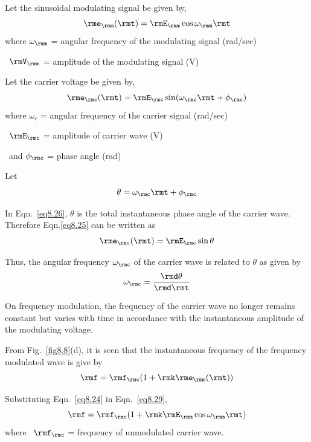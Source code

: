 
Let the sinusoidal modulating signal be given by,
\begin{equation}
\rme_\rmm(\rmt) = \rmE_\rmm \cos \omega_\rmm \rmt\label{eq8.24}
\end{equation}
where $\omega_\rmm$ = angular frequency of the modulating signal (rad/sec)

\quad~$\rmV_\rmm$ = amplitude of the modulating signal (V)

Let the carrier voltage be given by, 
\begin{equation}
\rme_\rmc(\rmt) = \rmE_\rmc \sin (\omega_\rmc \rmt + \phi_\rmc) \label{eq8.25}
\end{equation}
where $\omega_c$ = angular frequency of the carrier signal (rad/sec)

\quad~$\rmE_\rmc$ = amplitude of carrier wave (V)

\noindent
\quad~and $\phi_\rmc$ = phase angle (rad)

Let 
\begin{equation}
\theta = \omega_\rmc \rmt  + \phi_\rmc\label{eq8.26}
\end{equation}

In Eqn.~\eqref{eq8.26}, $\theta$ is the total instantaneous phase
angle of the carrier wave. Therefore Eqn.\eqref{eq8.25} can be written
as 
\begin{equation}
\rme_\rmc (\rmt) = \rmE_\rmc \sin \theta \label{eq8.27}
\end{equation}

Thus, the angular frequency $\omega_\rmc$ of the carrier wave is related
to $\theta$ as given by 
\begin{equation}
\omega_\rmc = \dfrac{\rmd  \theta}{\rmd\rmt} \label{eq8.28}
\end{equation}

On frequency modulation, the frequency of the carrier wave no longer
remains constant but  varies with time in accordance with the
instantaneous amplitude of the modulating voltage.

From Fig.~\ref{fig8.8}(d), it is seen that the instantaneous frequency
of the frequency modulated wave is give by
\begin{equation}
\rmf = \rmf_\rmc (1+\rmk \rme_\rmm (\rmt)) \label{eq8.29}
\end{equation}

Substituting Eqn.~\eqref{eq8.24} in Eqn.~\eqref{eq8.29},
\begin{equation}
\rmf= \rmf_\rmc (1+\rmk \rmE_\rmm \cos \omega_\rmm \rmt)\label{eq8.30}
\end{equation}
where~ $\rmf_\rmc$ = frequency of unmodulated carrier wave.

